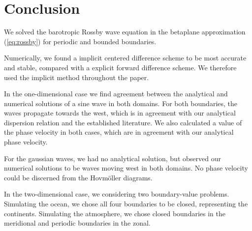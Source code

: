 \section{Conclusion}
\label{sec:conclusion}
We solved the barotropic Rossby wave equation in the betaplane approximation (\ref{eq:rossby}) for periodic and bounded boundaries.

Numerically, we found a implicit centered difference scheme to be most accurate and stable, compared with a explicit forward difference scheme. We therefore used the implicit method throughout the paper.

In the one-dimensional case we find agreement between the analytical and numerical solutions of a sine wave in both domains. For both boundaries, the waves propagate towards the west, which is in agreement with our analytical dispersion relation and the established literature. We also calculated a value of the phase velocity in both cases, which are in agreement with our analytical phase velocity.

For the gaussian waves, we had no analytical solution, but observed our numerical solutions to be waves moving west in both domains. No phase velocity could be discerned from the Hovmöller diagrams.

In the two-dimensional case, we considering two boundary-value problems. Simulating the ocean, we chose all four boundaries to be closed, representing the continents. Simulating the atmosphere, we chose closed boundaries in the meridional and periodic boundaries in the zonal.